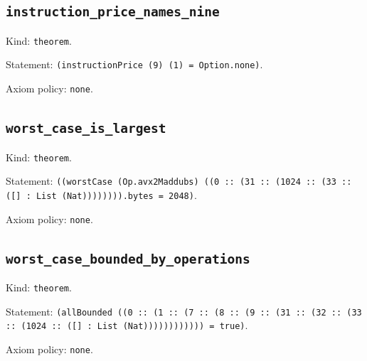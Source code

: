 \documentclass[11pt]{article}
\begin{document}
\subsection*{\texttt{instruction\_price\_names\_nine}}
\noindent Kind: \texttt{theorem}.\par
\noindent Statement: \texttt{(instructionPrice (9) (1) = Option.none)}.\par
\noindent Axiom policy: \texttt{none}.\par
\subsection*{\texttt{worst\_case\_is\_largest}}
\noindent Kind: \texttt{theorem}.\par
\noindent Statement: \texttt{((worstCase (Op.avx2Maddubs) ((0 :: (31 :: (1024 :: (33 :: ([] : List (Nat)))))))).bytes = 2048)}.\par
\noindent Axiom policy: \texttt{none}.\par
\subsection*{\texttt{worst\_case\_bounded\_by\_operations}}
\noindent Kind: \texttt{theorem}.\par
\noindent Statement: \texttt{(allBounded ((0 :: (1 :: (7 :: (8 :: (9 :: (31 :: (32 :: (33 :: (1024 :: ([] : List (Nat)))))))))))) = true)}.\par
\noindent Axiom policy: \texttt{none}.\par
\end{document}

